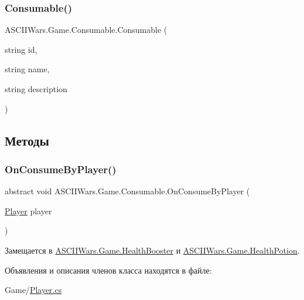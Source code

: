 \subsubsection{\texorpdfstring{Consumable()}{Consumable()}}
{\footnotesize\ttfamily A\+S\+C\+I\+I\+Wars.\+Game.\+Consumable.\+Consumable (\begin{DoxyParamCaption}\item[{string}]{id,  }\item[{string}]{name,  }\item[{string}]{description }\end{DoxyParamCaption})\hspace{0.3cm}{\ttfamily [inline]}}



\subsection{Методы}
\hypertarget{class_a_s_c_i_i_wars_1_1_game_1_1_consumable_a6aac67fe076ca39cb850e3720461fff8}{}\label{class_a_s_c_i_i_wars_1_1_game_1_1_consumable_a6aac67fe076ca39cb850e3720461fff8} 
\subsubsection{\texorpdfstring{On\+Consume\+By\+Player()}{OnConsumeByPlayer()}}
{\footnotesize\ttfamily abstract void A\+S\+C\+I\+I\+Wars.\+Game.\+Consumable.\+On\+Consume\+By\+Player (\begin{DoxyParamCaption}\item[{\hyperlink{class_a_s_c_i_i_wars_1_1_game_1_1_player}{Player}}]{player }\end{DoxyParamCaption})\hspace{0.3cm}{\ttfamily [pure virtual]}}



Замещается в \hyperlink{class_a_s_c_i_i_wars_1_1_game_1_1_health_booster_a0dd6134e102b2b4ea9d143b7cea15568}{A\+S\+C\+I\+I\+Wars.\+Game.\+Health\+Booster} и \hyperlink{class_a_s_c_i_i_wars_1_1_game_1_1_health_potion_a3004d1c2396e9c068ed4e03884afd56c}{A\+S\+C\+I\+I\+Wars.\+Game.\+Health\+Potion}.



Объявления и описания членов класса находятся в файле\+:\begin{DoxyCompactItemize}
\item 
Game/\hyperlink{_player_8cs}{Player.\+cs}\end{DoxyCompactItemize}
